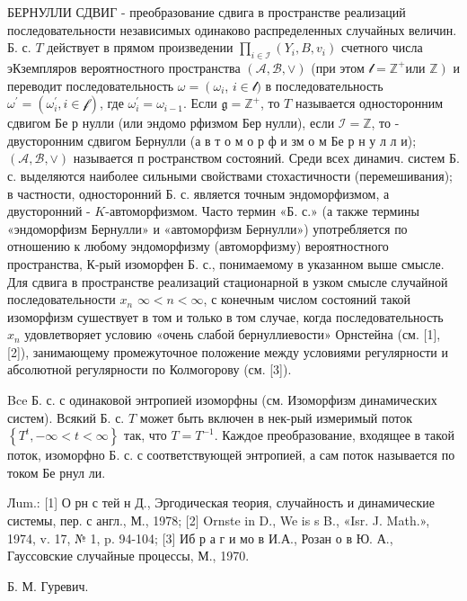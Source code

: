 \documentclass[10pt]{article}
\begin{document}
БЕРНУЛЛИ СДВИГ - преобразование сдвига в пространстве реализаций последовательности независимых одинаково распределенных случайных величин. Б. с. $T$ действует в прямом произведении $\prod_{i \in \mathscr{I}}\left(Y_{i}, B, v_{i}\right)$ счетного числа эКземпляров вероятностного пространства $(\mathscr{A}, \mathscr{B}, \vee)$ (при этом $\mathscr{l}=\mathbb{Z}^{+}$или $\left.\mathbb{Z}\right)$ и переводит последовательность $\omega=\left(\omega_{i}\right.$, $i \in \mathscr{l})$ в последовательность $\omega^{\prime}=\left(\omega_{i}^{\prime}, i \in \mathscr{f}\right)$, где $\omega_{i}^{\prime}=\omega_{i-1}$. Если $\mathfrak{g}=\mathbb{Z}^{+}$, то $T$ называется односторонним сдвигом Бе р нулли (или эндомо рфизмом Бер нулли), если $\mathscr{I}=\mathbb{Z}$, то - двусторонним сдвигом Бернулли (а в т о м о р ф и зм о м Бе р н у л л и); $(\mathcal{A}, \mathcal{B}, \vee)$ называется п ространством состояний. Среди всех динамич. систем Б. с. выделяются наиболее сильными свойствами стохастичности (перемешивания); в частности, односторонний Б. с. является точным эндоморфизмом, а двусторонний - $K$-автоморфизмом. Часто термин «Б. с.» (а также термины «эндоморфизм Бернулли» и «автоморфизм Бернулли») употребляется по отношению к любому эндоморфизму (автоморфизму) вероятностного пространства, К-рый изоморфен Б. с., понимаемому в указанном выше смысле. Для сдвига в пространстве реализаций стационарной в узком смысле случайной последовательности $x_{n}$ $\infty<n<\infty$, с конечным числом состояний такой изоморфизм сушествует в том и только в том случае, когда последовательность $x_{n}$ удовлетворяет условию «очень слабой бернуллиевости» Орнстейна (см. [1], [2]), занимающему промежуточное положение между условиями регулярности и абсолютной регулярности по Колмогорову (см. [3]).



Bce Б. с. с одинаковой энтропией изоморфны (см. Изоморфизм динамических систем). Всякий Б. с. $T$ может быть включен в нек-рый измеримый поток $\left\{T^{t},-\infty<t<\infty\right\}$ так, что $T=T^{-1}$. Каждое преобразование, входящее в такой поток, изоморфно Б. с. с соответствующей энтропией, а сам поток называется по током Бе рнул ли.



Лum.: [1] О рн с тей н Д., Эргодическая теория, случайность и динамические системы, пер. с англ., М., 1978; [2] Ornste in D., We is s B., «Isr. J. Math.», 1974, v. 17, № 1, p. 94-104; [3] Иб р а г и мо в И.А., Розан о в Ю. А., Гауссовские случайные процессы, М., 1970.



Б. М. Гуревич.
\end{document}
